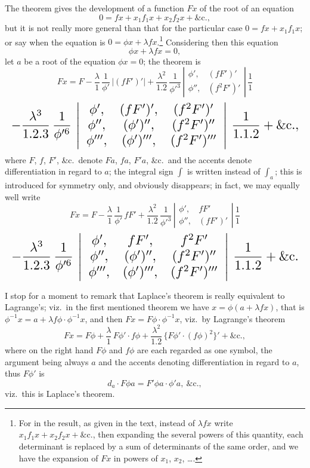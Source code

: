 \documentclass[11pt]{article}
\begin{document}
The theorem gives the development of a function $Fx$ of the root of an equation
\[
0 = fx + x_{1}f_{1}x + x_{2}f_{2}x + \&\mathrm{c.},
\]
but it is not really more general than that for the particular case $0 = fx + x_{1}f_{1}x$; or say when the equation is $0 = \phi x + \lambda fx$.\footnote{For in the result, as given in the text, instead of $\lambda fx$ write $x_{1}f_{1}x + x_{2}f_{2}x + \&\mathrm{c.}$, then expanding the several powers of this quantity, each determinant is replaced by a sum of determinants of the same order, and we have the expansion of $Fx$ in powers of $x_{1}$, $x_{2}$, \ldots.} Considering then this equation
\[
\phi x + \lambda fx = 0,
\]
let $a$ be a root of the equation $\phi x = 0$; the theorem is
\[
Fx = F
- \frac{\lambda}{1}\,\frac{1}{\phi'}\,\bigl|(fF')'\bigr|
+ \frac{\lambda^{2}}{1.2}\,\frac{1}{\phi'^{3}}\,\left|\begin{array}{cc}\phi',&(fF')'\\ \phi'',&(f^{2}F')'\end{array}\right|\,\frac{1}{1}
\]
\[ \resizebox{\textwidth}{!}{$\displaystyle
- \frac{\lambda^{3}}{1.2.3}\,\frac{1}{\phi'^{6}}\,\left|\begin{array}{ccc}\phi',&(fF')',&(f^{2}F')'\\ \phi'',&(\phi')'',&(f^{2}F')''\\ \phi''',&(\phi')''',&(f^{2}F')'''\end{array}\right|\,\frac{1}{1.1.2} + \&\mathrm{c.},
$} \]
where $F$, $f$, $F'$, \&c.\ denote $Fa$, $fa$, $F'a$, \&c.\ and the accents denote differentiation in regard to $a$; the integral sign $\int$ is written instead of $\int_{a}$; this is introduced for symmetry only, and obviously disappears; in fact, we may equally well write
\[
Fx = F
- \frac{\lambda}{1}\,\frac{1}{\phi'}\,fF'
+ \frac{\lambda^{2}}{1.2}\,\frac{1}{\phi'^{3}}\,\left|\begin{array}{cc}\phi',&fF'\\ \phi'',&(fF')'\end{array}\right|\,\frac{1}{1}
\]
\[ \resizebox{\textwidth}{!}{$\displaystyle
- \frac{\lambda^{3}}{1.2.3}\,\frac{1}{\phi'^{6}}\,\left|\begin{array}{ccc}\phi',&fF',&f^{2}F'\\ \phi'',&(\phi')'',&(f^{2}F')''\\ \phi''',&(\phi')''',&(f^{2}F')'''\end{array}\right|\,\frac{1}{1.1.2} + \&\mathrm{c.}
$} \]

I stop for a moment to remark that Laplace's theorem is really equivalent to Lagrange's; viz.\ in the first mentioned theorem we have $x = \phi(a+\lambda fx)$, that is $\phi^{-1}x = a + \lambda f\phi \cdot \phi^{-1}x$, and then $Fx = F\phi \cdot \phi^{-1}x$, viz.\ by Lagrange's theorem
\[
Fx = F\phi + \frac{\lambda}{1}\,F\phi' \cdot f\phi + \frac{\lambda^{2}}{1.2}\,\{F\phi' \cdot (f\phi)^{2}\}' + \&\mathrm{c.},
\]
where on the right hand $F\phi$ and $f\phi$ are each regarded as one symbol, the argument being always $a$ and the accents denoting differentiation in regard to $a$, thus $F\phi'$ is
\[
d_{a}\!\cdot\! F\phi a = F'\phi a \cdot \phi' a,\ \&\mathrm{c.},
\]
viz.\ this is Laplace's theorem.
\end{document}
